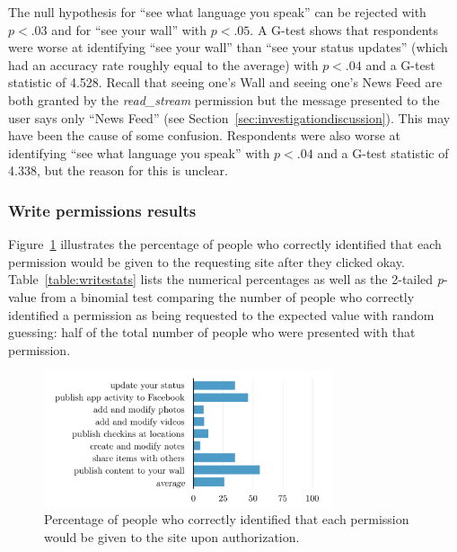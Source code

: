 \documentclass[10pt]{sig-alternate-10pt}
\begin{document}
The null hypothesis for ``see what language you speak'' can be rejected with $p < .03$ and for ``see your wall'' with $p < .05$. A G-test shows that respondents were worse at identifying ``see your wall'' than ``see your status updates'' (which had an accuracy rate roughly equal to the average) with $p < .04$ and a G-test statistic of 4.528. Recall that seeing one's Wall and seeing one's News Feed are both granted by the \emph{read\_stream} permission but the message presented to the user says only ``News Feed'' (see Section~\ref{sec:investigationdiscussion}). This may have been the cause of some confusion. Respondents were also worse at identifying ``see what language you speak'' with $p < .04$ and a G-test statistic of 4.338, but the reason for this is unclear.

\subsubsection{Write permissions results}

Figure~\ref{figure:writepercents} illustrates the percentage of people who correctly identified that each permission would be given to the requesting site after they clicked okay. Table~\ref{table:writestats} lists the numerical percentages as well as the 2-tailed \emph{p}-value from a binomial test comparing the number of people who correctly identified a permission as being requested to the expected value with random guessing: half of the total number of people who were presented with that permission.

\begin{figure}[h!]
  \centering
  \includegraphics[width=8.5cm]{write_percents_cosn}
  \caption{Percentage of people who correctly identified that each permission would be given to the site upon authorization.}
  \label{figure:writepercents}
\end{figure}
\end{document}
